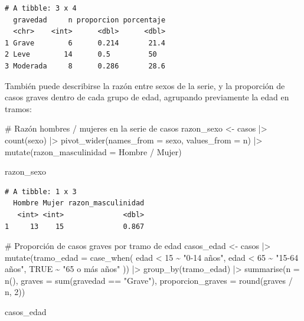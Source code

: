 \documentclass[
  spanish,
  a4paper,
]{scrreport}
\newenvironment{Shaded}{\begin{snugshade}}{\end{snugshade}}
\newcommand{\AttributeTok}[1]{\textcolor[rgb]{0.40,0.45,0.13}{#1}}
\newcommand{\CommentTok}[1]{\textcolor[rgb]{0.37,0.37,0.37}{#1}}
\newcommand{\ConstantTok}[1]{\textcolor[rgb]{0.56,0.35,0.01}{#1}}
\newcommand{\DecValTok}[1]{\textcolor[rgb]{0.68,0.00,0.00}{#1}}
\newcommand{\FunctionTok}[1]{\textcolor[rgb]{0.28,0.35,0.67}{#1}}
\newcommand{\NormalTok}[1]{\textcolor[rgb]{0.00,0.23,0.31}{#1}}
\newcommand{\OtherTok}[1]{\textcolor[rgb]{0.00,0.23,0.31}{#1}}
\newcommand{\SpecialCharTok}[1]{\textcolor[rgb]{0.37,0.37,0.37}{#1}}
\newcommand{\StringTok}[1]{\textcolor[rgb]{0.13,0.47,0.30}{#1}}
\theoremstyle{definition}
\theoremstyle{definition}
\theoremstyle{remark}
\begin{document}
\begin{verbatim}
# A tibble: 3 x 4
  gravedad     n proporcion porcentaje
  <chr>    <int>      <dbl>      <dbl>
1 Grave        6      0.214       21.4
2 Leve        14      0.5         50  
3 Moderada     8      0.286       28.6
\end{verbatim}

También puede describirse la razón entre sexos de la serie, y la
proporción de casos graves dentro de cada grupo de edad, agrupando
previamente la edad en tramos:

\begin{Shaded}
\begin{Highlighting}[]
\CommentTok{\# Razón hombres / mujeres en la serie de casos}
\NormalTok{razon\_sexo }\OtherTok{\textless{}{-}}\NormalTok{ casos }\SpecialCharTok{|\textgreater{}}
  \FunctionTok{count}\NormalTok{(sexo) }\SpecialCharTok{|\textgreater{}}
  \FunctionTok{pivot\_wider}\NormalTok{(}\AttributeTok{names\_from =}\NormalTok{ sexo, }\AttributeTok{values\_from =}\NormalTok{ n) }\SpecialCharTok{|\textgreater{}}
  \FunctionTok{mutate}\NormalTok{(}\AttributeTok{razon\_masculinidad =}\NormalTok{ Hombre }\SpecialCharTok{/}\NormalTok{ Mujer)}

\NormalTok{razon\_sexo}
\end{Highlighting}
\end{Shaded}

\begin{verbatim}
# A tibble: 1 x 3
  Hombre Mujer razon_masculinidad
   <int> <int>              <dbl>
1     13    15              0.867
\end{verbatim}

\begin{Shaded}
\begin{Highlighting}[]
\CommentTok{\# Proporción de casos graves por tramo de edad}
\NormalTok{casos\_edad }\OtherTok{\textless{}{-}}\NormalTok{ casos }\SpecialCharTok{|\textgreater{}}
  \FunctionTok{mutate}\NormalTok{(}\AttributeTok{tramo\_edad =} \FunctionTok{case\_when}\NormalTok{(}
\NormalTok{    edad }\SpecialCharTok{\textless{}} \DecValTok{15} \SpecialCharTok{\textasciitilde{}} \StringTok{"0{-}14 años"}\NormalTok{,}
\NormalTok{    edad }\SpecialCharTok{\textless{}} \DecValTok{65} \SpecialCharTok{\textasciitilde{}} \StringTok{"15{-}64 años"}\NormalTok{,}
    \ConstantTok{TRUE} \SpecialCharTok{\textasciitilde{}} \StringTok{"65 o más años"}
\NormalTok{  )) }\SpecialCharTok{|\textgreater{}}
  \FunctionTok{group\_by}\NormalTok{(tramo\_edad) }\SpecialCharTok{|\textgreater{}}
  \FunctionTok{summarise}\NormalTok{(}\AttributeTok{n =} \FunctionTok{n}\NormalTok{(),}
            \AttributeTok{graves =} \FunctionTok{sum}\NormalTok{(gravedad }\SpecialCharTok{==} \StringTok{"Grave"}\NormalTok{),}
            \AttributeTok{proporcion\_graves =} \FunctionTok{round}\NormalTok{(graves }\SpecialCharTok{/}\NormalTok{ n, }\DecValTok{2}\NormalTok{))}

\NormalTok{casos\_edad}
\end{Highlighting}
\end{Shaded}
\end{document}
